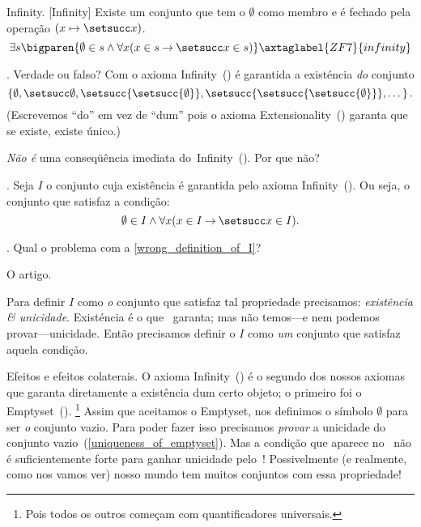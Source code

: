 \axiom Infinity.
[Infinity]%
\label{infinity}%
Existe um conjunto que tem o $\emptyset$ como membro e é fechado pela
operação $(x \mapsto \setsucc x)$.
$$
\exists s
\bigparen{
\emptyset \in s
\land
\forall x
\paren{
x \in s
\limplies
\setsucc x \in s
}
}
\axtaglabel{ZF7}{infinity}
$$

\exercise.
Verdade ou falso?
Com o axioma Infinity~() é garantida a existéncia \emph{do} conjunto
$$
\set {
\emptyset,
\setsucc\emptyset,
\setsucc{\setsucc{\emptyset}},
\setsucc{\setsucc{\setsucc{\emptyset}}},
\dotsc
}.
$$
(Escrevemos ``do'' em vez de ``dum'' pois o axioma
Extensionality~() garanta que se existe, existe único.)

\hint
\emph{Não é} uma conseqüência imediata do~Infinity~().
Por que não?

\endexercise

.
\label{wrong_definition_of_I}%
Seja $I$ o conjunto cuja existência é garantida pelo axioma Infinity~().
Ou seja, o conjunto que satisfaz a condição:
$$
\emptyset \in I \land \forall x \paren{x \in I \limplies \setsucc x \in I}.
$$
\mistake

\exercise.
\label{def_of_I_used_definite_articile}%
Qual o problema com a \ref{wrong_definition_of_I}?

\hint
O artigo.

\solution
Para definir $I$ como \emph{o} conjunto que satisfaz tal propriedade
precisamos: \emph{existência \& unicidade}.
Existéncia é o que~ garanta;
mas não temos---e nem podemos provar---unicidade.
Então precisamos definir o $I$ como \emph{um} conjunto
que satisfaz aquela condição.

\endexercise

\note Efeitos e efeitos colaterais.
O axioma Infinity~() é o segundo dos nossos axiomas
que garanta diretamente a existência dum certo objeto;
o primeiro foi o Emptyset~().%
\footnote{Pois todos os outros começam com quantificadores universais.}
Assim que aceitamos o Emptyset, nos definimos o símbolo $\emptyset$
para ser \emph{o} conjunto vazio.
Para poder fazer isso precisamos \emph{provar} a unicidade
do conjunto vazio~(\ref{uniqueness_of_emptyset}).
Mas a condição que aparece no~ não é
suficientemente forte para ganhar unicidade pelo~!
Possivelmente (e realmente, como nos vamos ver) nosso mundo tem muitos
conjuntos com essa propriedade!

